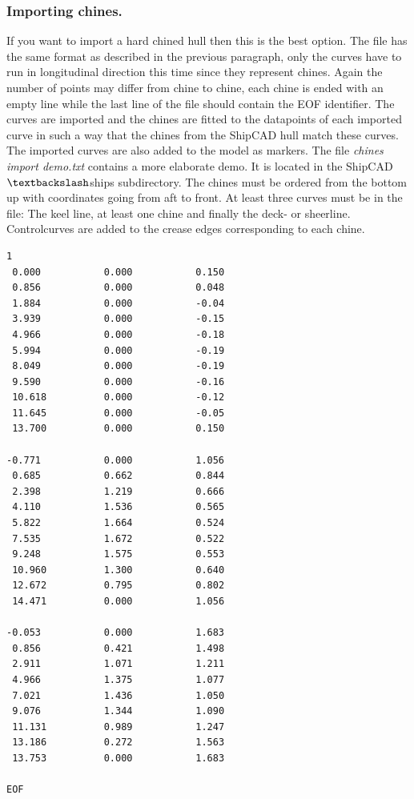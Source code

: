 \documentclass[12pt]{article}
\begin{document}
\subsubsection{Importing chines.} \label{import-chines}
If you want to import a hard chined hull then this is the best
option. The file has the same format as described in the previous
paragraph, only the curves have to run in longitudinal direction this
time since they represent chines. Again the number of points may
differ from chine to chine, each chine is ended with an empty line
while the last line of the file should contain the EOF identifier.
The curves are imported and the chines are fitted to the datapoints of
each imported curve in such a way that the chines from the ShipCAD
hull match these curves.  The imported curves are also added to the
model as markers. The file \textit{chines import demo.txt} contains a
more elaborate demo. It is located in the ShipCAD$\textbackslash$ships
subdirectory. The chines must be ordered from the bottom up with
coordinates going from aft to front. At least three curves must be in
the file: The keel line, at least one chine and finally the deck- or
sheerline. Controlcurves are added to the crease edges corresponding
to each chine.

\begin{verbatim}
1
 0.000           0.000           0.150
 0.856           0.000           0.048
 1.884           0.000           -0.04
 3.939           0.000           -0.15
 4.966           0.000           -0.18
 5.994           0.000           -0.19
 8.049           0.000           -0.19
 9.590           0.000           -0.16
 10.618          0.000           -0.12
 11.645          0.000           -0.05
 13.700          0.000           0.150
 
-0.771           0.000           1.056
 0.685           0.662           0.844
 2.398           1.219           0.666
 4.110           1.536           0.565
 5.822           1.664           0.524
 7.535           1.672           0.522
 9.248           1.575           0.553
 10.960          1.300           0.640
 12.672          0.795           0.802
 14.471          0.000           1.056
 
-0.053           0.000           1.683
 0.856           0.421           1.498
 2.911           1.071           1.211
 4.966           1.375           1.077
 7.021           1.436           1.050
 9.076           1.344           1.090
 11.131          0.989           1.247
 13.186          0.272           1.563
 13.753          0.000           1.683

EOF
\end{verbatim}
\end{document}
